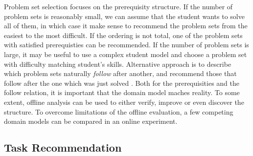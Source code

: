 
Problem set selection focuses on the prerequisity structure.
If the number of problem sets is reasonably small, we can assume that the student
wants to solve all of them, in which case it make sense to recommend the problem
sets from the easiest to the most difficult.
If the ordering is not total, one of the problem sets with satisfied prerequisties
can be recommended.
If the number of problem sets is large, it may be useful to use a complex student model
and choose a problem set with difficulty matching student's skills.
Alternative approach is to describe which problem sets naturally \emph{follow} after another,
and recommend those that follow after the one which was just solved .
Both for the prerequisities and the follow relation, it is important that the
domain model maches reality.  %
To some extent, offline analysis can be used to either verify, improve or even
discover the structure. To overcome limitations of the offline evaluation,
a few competing domain models can be compared in an online experiment.


\subsection{Task Recommendation}  %
\label{sec:task-recommendation}

